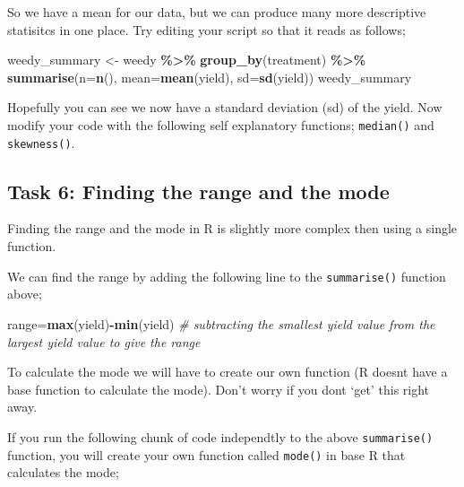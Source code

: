\documentclass[
]{book}
\newenvironment{Shaded}{\begin{snugshade}}{\end{snugshade}}
\newcommand{\AttributeTok}[1]{\textcolor[rgb]{0.13,0.29,0.53}{#1}}
\newcommand{\CommentTok}[1]{\textcolor[rgb]{0.56,0.35,0.01}{\textit{#1}}}
\newcommand{\FunctionTok}[1]{\textcolor[rgb]{0.13,0.29,0.53}{\textbf{#1}}}
\newcommand{\NormalTok}[1]{#1}
\newcommand{\OtherTok}[1]{\textcolor[rgb]{0.56,0.35,0.01}{#1}}
\newcommand{\SpecialCharTok}[1]{\textcolor[rgb]{0.81,0.36,0.00}{\textbf{#1}}}
\begin{document}
So we have a mean for our data, but we can produce many more descriptive statisitcs in one place. Try editing your script so that it reads as follows;

\begin{Shaded}
\begin{Highlighting}[]
\NormalTok{weedy\_summary }\OtherTok{\textless{}{-}}\NormalTok{ weedy }\SpecialCharTok{\%\textgreater{}\%} 
  \FunctionTok{group\_by}\NormalTok{(treatment) }\SpecialCharTok{\%\textgreater{}\%} 
  \FunctionTok{summarise}\NormalTok{(}\AttributeTok{n=}\FunctionTok{n}\NormalTok{(),}
            \AttributeTok{mean=}\FunctionTok{mean}\NormalTok{(yield),}
            \AttributeTok{sd=}\FunctionTok{sd}\NormalTok{(yield))}
\NormalTok{weedy\_summary}
\end{Highlighting}
\end{Shaded}

Hopefully you can see we now have a standard deviation (sd) of the yield. Now modify your code with the following self explanatory functions; \texttt{median()} and \texttt{skewness()}.

\hypertarget{task-6-finding-the-range-and-the-mode}{%
\subsection{Task 6: Finding the range and the mode}\label{task-6-finding-the-range-and-the-mode}}

Finding the range and the mode in R is slightly more complex then using a single function.

We can find the range by adding the following line to the \texttt{summarise()} function above;

\begin{Shaded}
\begin{Highlighting}[]
\NormalTok{range}\OtherTok{=}\FunctionTok{max}\NormalTok{(yield)}\SpecialCharTok{{-}}\FunctionTok{min}\NormalTok{(yield) }\CommentTok{\# subtracting the smallest yield value from the largest yield value to give the range}
\end{Highlighting}
\end{Shaded}

To calculate the mode we will have to create our own function (R doesnt have a base function to calculate the mode). Don't worry if you dont `get' this right away.

If you run the following chunk of code independtly to the above \texttt{summarise()} function, you will create your own function called \texttt{mode()} in base R that calculates the mode;
\end{document}

